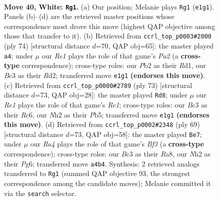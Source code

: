 \documentclass[11pt]{article}
\begin{document}
\clearpage

\begin{figure}[p]\centering
\begin{subfigure}{0.46\textwidth}\centering
\resizebox{\linewidth}{!}{%
\newchessgame
\chessboard[
  setfen={1k3b1r/rp4p1/p1p4p/P2b1p2/R1p4P/2B1P1P1/1P3P1N/2K1R3 w - - 2 40},
  showmover=false,
  pgfstyle=straightmove, color=movearrow, markmove={e1-g1}
]}
\caption{}
\end{subfigure}\hfill
\begin{subfigure}{0.46\textwidth}\centering
\resizebox{\linewidth}{!}{%
\newchessgame
\chessboard[
  setfen={3r4/5pk1/pprpp2p/4b1pP/2P1P1P1/1P2B3/P2R1PK1/3R4 w - - 1 38},
  showmover=false,
  pgfstyle=straightmove, color=movearrow, markmove={a2-a4}
]}
\caption{}
\end{subfigure}
\\[4pt]
\begin{subfigure}{0.46\textwidth}\centering
\resizebox{\linewidth}{!}{%
\newchessgame
\chessboard[
  setfen={4r1k1/8/p1rPpp1p/PpP1b1pP/6P1/3R1P2/2R3K1/6B1 b - - 2 37},
  showmover=false,
  pgfstyle=straightmove, color=movearrow, markmove={e8-d8}
]}
\caption{}
\end{subfigure}\hfill
\begin{subfigure}{0.46\textwidth}\centering
\resizebox{\linewidth}{!}{%
\newchessgame
\chessboard[
  setfen={rr3k2/1p3p2/4pbp1/1BPp4/P2P3p/K3P2P/2R3P1/3R4 b - - 0 35},
  showmover=false,
  pgfstyle=straightmove, color=movearrow, markmove={f6-e7}
]}
\caption{}
\end{subfigure}
\caption{\textbf{Move 40, White: \texttt{Rg1}.} (a) Our position; Melanie plays \texttt{Rg1} (\texttt{e1g1}). Panels (b)--(d) are the retrieved master positions whose correspondence most drove this move (highest QAP objective among those that transfer to it). (b) Retrieved from \texttt{ccrl\_top\_p0003\#2000} (ply 74) [structural distance $d$=70, QAP obj=65]: the master played \texttt{a4}; under $\mu$ our \emph{Re1} plays the role of that game's \emph{Pa2} (a \textbf{cross-type} correspondence); cross-type roles: our \emph{P}b2 as their \emph{R}d1, our \emph{B}c3 as their \emph{R}d2; transferred move \texttt{e1g1} \textbf{(endorses this move)}. (c) Retrieved from \texttt{ccrl\_top\_p0000\#2789} (ply 73) [structural distance $d$=73, QAP obj=28]: the master played \texttt{Rd8}; under $\mu$ our \emph{Re1} plays the role of that game's \emph{Re1}; cross-type roles: our \emph{B}c3 as their \emph{R}c6, our \emph{N}h2 as their \emph{P}b5; transferred move \texttt{e1g1} \textbf{(endorses this move)}. (d) Retrieved from \texttt{ccrl\_top\_p0002\#2348} (ply 69) [structural distance $d$=73, QAP obj=58]: the master played \texttt{Be7}; under $\mu$ our \emph{Ra4} plays the role of that game's \emph{Bf3} (a \textbf{cross-type} correspondence); cross-type roles: our \emph{B}c3 as their \emph{R}a8, our \emph{N}h2 as their \emph{P}g6; transferred move \texttt{a4b4}. Synthesis: 2 retrieved analogs transferred to \texttt{Rg1} (summed QAP objective 93, the strongest correspondence among the candidate moves); Melanie committed it via the \texttt{search} selector.}
\label{fig:thought-m78}
\end{figure}
\end{document}
